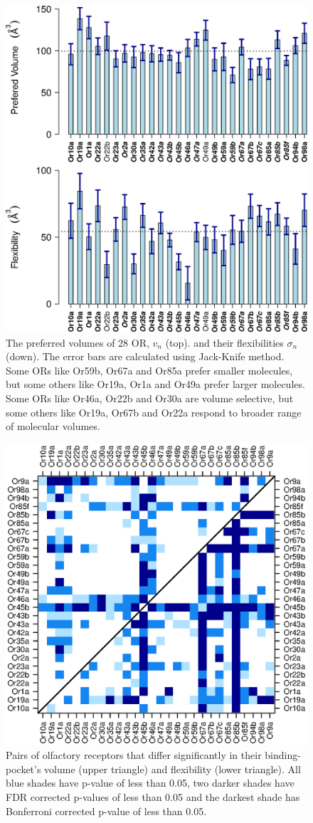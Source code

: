 \documentclass[11pt]{paper} %
\newcommand{\numberofreceptors}{ 28 }
\begin{document}
\begin{figure}
		\centering
		\includegraphics[width= 0.85  \textwidth]{vol-mean-std}
	\caption{The preferred volumes of \numberofreceptors OR, $v_n$ (top). 
		and their flexibilities $\sigma_n$ (down). 
		The error bars are calculated using Jack-Knife method. 
		Some ORs like Or59b, Or67a and  Or85a prefer smaller molecules, 
		but some others like Or19a,  Or1a and  Or49a prefer larger molecules.
		Some ORs like Or46a,  Or22b and Or30a are volume  selective, 
		but some others like Or19a,  Or67b and  Or22a respond to broader range of molecular volumes.
		}
		\label{fig:preferred_volume}
\end{figure}


\begin{figure}
	\centering
	\includegraphics[width= 0.75 \textwidth]{pair-pval}
	\caption{Pairs of olfactory receptors that differ significantly in their binding-pocket's volume (upper triangle) and flexibility (lower triangle).
			All blue shades have p-value of less than 0.05, 
			two darker shades have FDR corrected p-values of less than 0.05 and the darkest shade has Bonferroni corrected p-value of less than 0.05.}
	\label{fig:p-values}
\end{figure}
\end{document}
